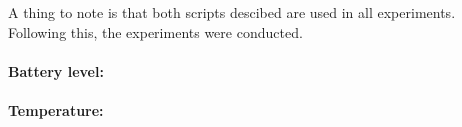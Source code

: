 A thing to note is that both scripts descibed are used in all experiments. Following this, the experiments were conducted. 



\paragraph{Battery level:}




\paragraph{Temperature:}







